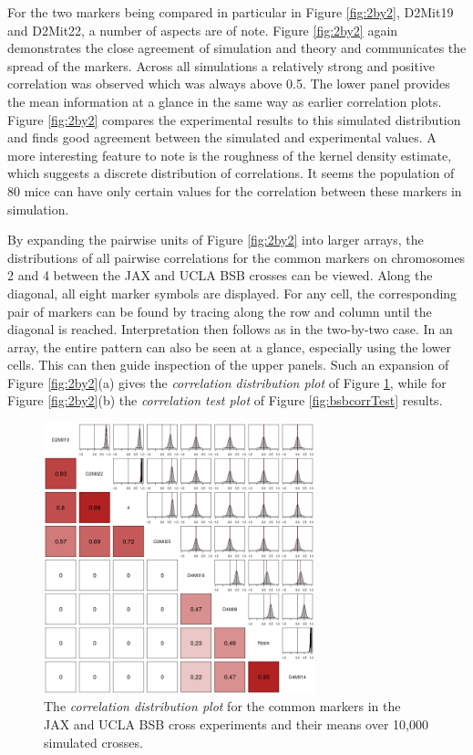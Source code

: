 \documentclass{article}
\begin{document}
For the two markers being compared in particular in Figure \ref{fig:2by2}, D2Mit19 and D2Mit22, a number of aspects are of note. Figure \ref{fig:2by2} again demonstrates the close agreement of simulation and theory and communicates the spread of the markers. Across all simulations a relatively strong and positive correlation was observed which was always above 0.5. The lower panel provides the mean information at a glance in the same way as earlier correlation plots. Figure \ref{fig:2by2} compares the experimental results to this simulated distribution and finds good agreement between the simulated and experimental values. A more interesting feature to note is the roughness of the kernel density estimate, which suggests a discrete distribution of correlations. It seems the population of 80 mice can have only certain values for the correlation between these markers in simulation.

By expanding the pairwise units of Figure \ref{fig:2by2} into larger arrays, the distributions of all pairwise correlations for the common markers on chromosomes 2 and 4 between the JAX and UCLA BSB crosses can be viewed. Along the diagonal, all eight marker symbols are displayed. For any cell, the corresponding pair of markers can be found by tracing along the row and column until the diagonal is reached. Interpretation then follows as in the two-by-two case. In an array, the entire pattern can also be seen at a glance, especially using the lower cells. This can then guide inspection of the upper panels. Such an expansion of Figure \ref{fig:2by2}(a) gives the \emph{correlation distribution plot} of Figure \ref{fig:bsbcorrDist}, while for Figure \ref{fig:2by2}(b) the \emph{correlation test plot} of Figure \ref{fig:bsbcorrTest} results.

\begin{figure}[htp]
  \begin{center}
      \includegraphics[width = 0.7\textwidth]{./img/bsbCorrDist.png}
  \end{center}
  \caption{The \emph{correlation distribution plot} for the common markers in the JAX and UCLA BSB cross experiments and their means over 10,000 simulated crosses.}
  \label{fig:bsbcorrDist}
\end{figure}
\end{document}
